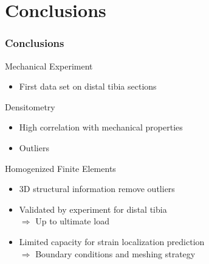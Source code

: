 \documentclass[xcolor=table,11pt]{beamer}
\begin{document}
	\section{Conclusions}
	
	\begin{frame}
		\frametitle{Conclusions}

		Mechanical Experiment
		\begin{itemize}
			\item First data set on distal tibia sections
		\end{itemize}

		\vspace{0.25cm}

		Densitometry
		\begin{itemize}
			\item High correlation with mechanical properties
			\item Outliers
		\end{itemize}

		\vspace{0.25cm}

		Homogenized Finite Elements
		\begin{itemize}
			\item 3D structural information remove outliers
			\item Validated by experiment for distal tibia\\
				  $\Rightarrow$ Up to ultimate load
			\item Limited capacity for strain localization prediction\\
			      $\Rightarrow$ Boundary conditions and meshing strategy
		\end{itemize}

	\end{frame}
	
	
\end{document}
